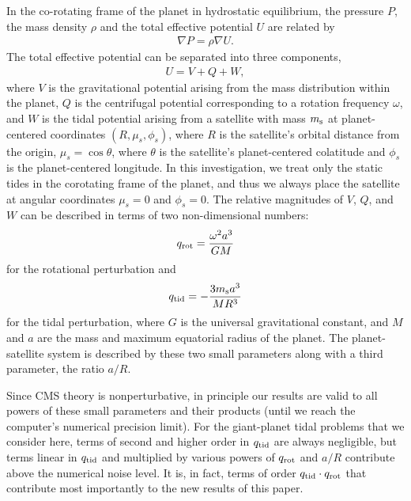 In the co-rotating frame of the planet in hydrostatic equilibrium,  the pressure $P$,
the mass density $\rho$ and the total effective potential $U$ are related by
%
\begin{equation} \begin{aligned} \nabla P = \rho \nabla U. \end{aligned}
    \label{eq:hydrostatic} \end{equation}
%
The total effective potential can be separated into three components,
%
\begin{equation} \begin{aligned} U = V + Q + W, \end{aligned}
    \label{eq:potential_components} \end{equation}
%
where $V$ is the gravitational potential arising from the mass distribution
within the planet, $Q$ is the centrifugal potential corresponding to a rotation
frequency $\omega$, and $W$ is the tidal potential arising from a satellite
with mass $m_{\rm s}$ at planet-centered coordinates $(R,\mu_s,\phi_s)$, where
$R$ is the satellite's orbital distance from the origin, $\mu_s=\cos \theta$,
where $\theta$ is the satellite's planet-centered colatitude and $\phi_s$ is
the planet-centered longitude.  In this investigation, we treat only the static
tides in the corotating frame of the planet, and thus  we always place the
satellite at angular coordinates $\mu_s=0$ and $\phi_s=0$.  The relative
magnitudes of $V$, $Q$, and $W$ can be described in terms of two
non-dimensional numbers:
%
\begin{equation} q_{\rm rot} = \frac{\omega^2 a^3}{GM} \label{eq:qrot} \end{equation}
%
for the rotational perturbation and
%
\begin{equation} q_{\rm tid} = -\frac{3m_{\rm s}a^3}{MR^3} \label{eq:qtid}
\end{equation}
%
for the tidal perturbation, where $G$ is the universal gravitational constant, and
$M$ and $a$ are the mass and maximum equatorial radius of the planet. The planet-satellite
system is described by these two small parameters along with a third parameter, the
ratio $a/R$. 

Since CMS theory is nonperturbative, in principle our results are valid to all powers
of these small parameters and their products (until we reach the computer's numerical
precision limit). For the giant-planet tidal problems that we consider here, terms of
second and higher order in $q_{\rm tid}$ are always negligible, but terms linear in
$q_{\rm tid}$ and multiplied by various powers of $q_{\rm rot}$ and $a/R$ contribute
above the numerical noise level.  It is, in fact, terms of order $q_{\rm tid} \cdot
q_{\rm rot}$ that contribute most importantly to the new results of this paper.


